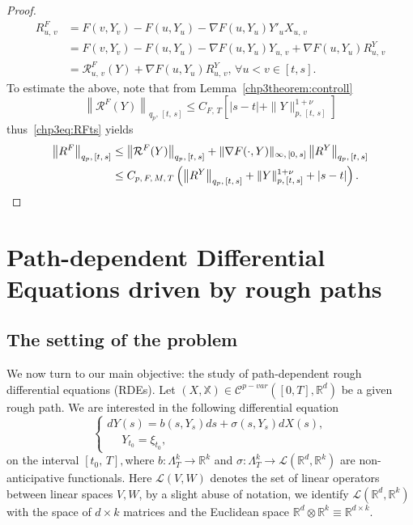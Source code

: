 \documentclass[AHL,Unicode,longabstracts,published]{cedram}
\newcommand{\bbX}{\mathbb{X}}
\newcommand{\calR}{\mathcal{R}}
\newcommand{\calL}{\mathcal{L}}
\newcommand{\calC}{\mathcal{C}}
\newcommand{\Rr}{{\mathbb{R}}}
\let\oldforall\forall
\renewcommand*{\forall}{\mathrel{\oldforall}}
\begin{document}
\begin{proof}
\begin{equation}
\begin{split}
R^F_{u,\,v}&=F\left(v,Y_v\right)-F\left(u,Y_u\right)-\nabla F\left(u,Y_u\right)Y'_uX_{u,\,v}\\
&=F\left(v,Y_v\right)-F\left(u,Y_u\right)-\nabla F\left(u,Y_u\right)Y_{u,\,v}+\nabla F\left(u,Y_u\right)R^Y_{u,\,v}\\
&=\calR^{F}_{u,\,v}(Y)+\nabla F\left(u,Y_u\right)R^Y_{u,\,v},\, \forall u< v \in [t, s].
\end{split}
\end{equation}
To estimate the above, note that from Lemma~\ref{chp3theorem:controll}
\[
\left\|\calR^{F}(Y)\right\|_{q_p,\,[t,\,s]}\leq C_{F,\,T} \left[|s-t|+\|Y\|_{p,\,[t,\,s]}^{1+\nu}\right]
\]
thus~\eqref{chp3eq:RFts} yields
\begin{equation}\label{chp3eq:RFfin}
\begin{split}
\left\|R^F\right\|_{q_p,\,[t,\,s]}&\leq \left\|\calR^{F}(Y)\right\|_{q_p,\,[t,\,s]}+\|\nabla F(\cdot,Y)\|_{\infty,\,[0,\,s]}\left\|R^Y\right\|_{q_p,\, [t,\,s]}\\
&\leq C_{p,\,F,\,M,\,T}\left(
\left\|R^Y\right\|_{q_p,\,[t,\,s]}+ \|Y\|_{p,\, [t,\,s]}^{1+\nu}+|s-t|\right).\qedhere
\end{split}
\end{equation}
\end{proof}



\section{Path-dependent Differential Equations driven by rough paths}\label{chp:existence}

\subsection{The setting of the problem}
We now turn to our main objective: the study of path-dependent rough differential equations (RDEs). Let $(X,\bbX)\in \calC^{p-var}([0,T],\Rr^d)$ be a given rough path. We are interested in the following differential equation
\begin{equation}\label{chp3ode}
\begin{cases}
dY(s)= b(s, Y_s)ds+\sigma(s,Y_s)dX (s),\\
\quad\;Y_{t_0}=\xi_{t_0},
\end{cases}
\end{equation}
on the interval $[t_0,\,T],$where $ b\colon \Lambda_T^k\to\Rr^k$ and $\sigma\colon \Lambda_T^k \to \calL(\Rr^d,\Rr^k)$ are non-anticipative functionals. Here $\calL(V,W)$ denotes the set of linear operators between linear spaces $V, W$, by a slight abuse of notation, we identify $\calL(\Rr^d,\Rr^k)$ with the space of $d\times k$ matrices and the Euclidean space $\Rr^d\otimes\Rr^k\equiv\Rr^{d\times k}$.
\end{document}
